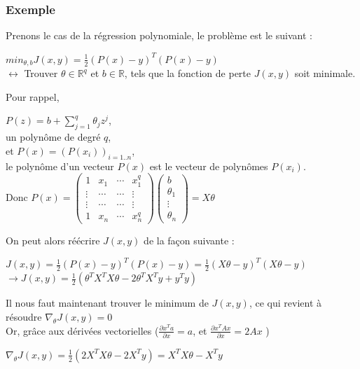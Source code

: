 \documentclass[10pt,a4paper]{report}
\begin{document}
			\subsubsection{Exemple}
			Prenons le cas de la régression polynomiale, le problème est le suivant :
			\begin{center}
				$min_{\theta,b} J(x,y) = \frac{1}{2} (P(x)-y)^T(P(x)-y)$\\
				$\leftrightarrow$ Trouver $\theta \in \mathbb{R}^q$ et $b \in \mathbb{R}$, tels que la fonction de perte $J(x,y)$ soit minimale.
			\end{center}
			Pour rappel, 
				\begin{center}
					$P(z) = b + \sum_{j=1}^{q}{\theta_j z^j}$,\\
					un polynôme de degré $q$,\\
					et $P(x) = (P(x_i))_{i=1..n}$,\\
					le polynôme d'un vecteur $P(x)$ est le vecteur de polynômes $P(x_i)$.\\
					Donc $P(x) = 
					\begin{pmatrix}
						1 & x_1 & \cdots & x_1^q \\ 
						\vdots & \cdots  & \cdots & \vdots \\ 
						\vdots & \cdots & \cdots & \vdots \\ 
						1 & x_n & \cdots & x_n^q
					\end{pmatrix} 
					\begin{pmatrix}
					b \\
					\theta_1 \\
					\vdots \\
					\theta_n
					\end{pmatrix}
					= X \theta
					$
				\end{center}
			On peut alors réécrire $J(x,y)$ de la façon suivante :
			\begin{center}
				$J(x,y) = \frac{1}{2} (P(x)-y)^T(P(x)-y) = \frac{1}{2} (X\theta-y)^T(X\theta-y)$\\
				$\rightarrow J(x,y) =\frac{1}{2} (\theta^TX^TX\theta - 2\theta^TX^Ty + y^Ty)$
			\end{center}
			Il nous faut maintenant trouver le minimum de $J(x,y)$, ce qui revient à résoudre $\nabla_\theta J(x,y) = 0$\\
			Or, grâce aux dérivées vectorielles ($\frac{\partial x^Ta}{\partial x} = a$, et $\frac{\partial x^TAx}{\partial x} = 2Ax$ )
			\begin{center}
				$\nabla_\theta J(x,y) = \frac{1}{2} (2X^TX\theta-2X^Ty) = X^TX\theta-X^Ty$
			\end{center}
\end{document}
